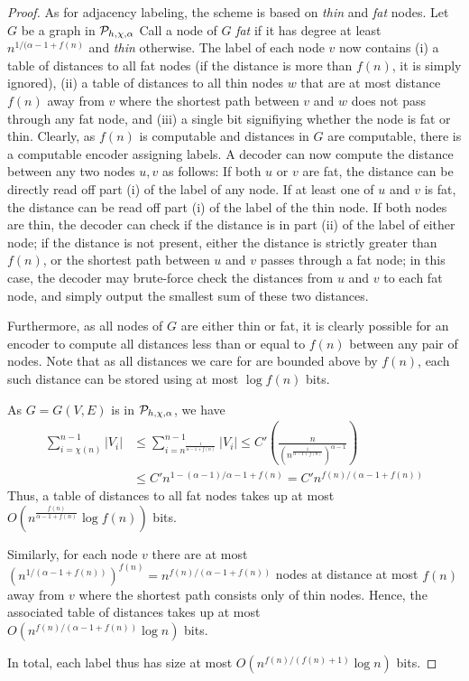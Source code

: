 \begin{proof}
As for adjacency labeling, the scheme is based on \emph{thin} and \emph{fat} nodes. Let $G$ be a graph
in $ \mathcal{P}_{h,\chi,\alpha}$ Call
a node of $G$ \emph{fat} if it has degree at least $n^{1/(\alpha - 1 + f(n)}$ and \emph{thin} otherwise.
The label of each node $v$ now contains (i) a table of distances to all fat nodes (if the distance is more than $f(n)$, it is simply ignored), (ii) a table of distances to all thin nodes $w$ that are at most distance $f(n)$ away from $v$
where the shortest path between $v$ and $w$ does not pass through any fat node, and (iii) a single bit signifiying whether the node is fat or thin.
Clearly, as $f(n)$ is computable and distances in $G$ are computable, there is a computable encoder
assigning labels. A decoder can now compute the distance between any two nodes $u,v$ as follows:
If both $u$ or $v$ are fat, the distance can be directly read off part (i) of the label of any node. If at least one of $u$ 
and $v$ is fat, the distance can be read off part (i) of the label of the thin node. If both nodes are thin, the decoder
can check if the distance is in part (ii) of the label of either node; if the distance is not present, 
either the distance is strictly greater than $f(n)$, or the shortest path between $u$ and $v$ passes through
a fat node; in this case, the decoder may brute-force check the distances from $u$ and $v$ to each fat node,
and simply output the smallest sum of these two distances.

Furthermore, as all nodes of $G$ are either thin or fat, it is clearly possible for an encoder to compute
all distances less than or equal to $f(n)$ between any pair of nodes. Note that as all distances we care for 
are bounded above by $f(n)$, each such distance can be stored using at most $\log f(n)$ bits.

As $G = G(V,E)$ is in $ \mathcal{P}_{h,\chi,\alpha}$, we have 
\begin{align*}
\sum_{i = \chi(n)}^{n-1} \vert V_i \vert
&\leq \sum_{i = n^{\frac{1}{\alpha - 1 + f(n)}}}^{n-1} \vert V_i \vert \leq C' \left( \frac{n}{\left( n^{\frac{1}{\alpha - 1 + f(n)}}\right)^{\alpha - 1}}\right)\\
&\leq C' n^{1 - (\alpha - 1)/{\alpha-1 + f(n)}} 
= C' n^{f(n)/(\alpha - 1 + f(n))}
\end{align*}
 Thus, a table of distances to all fat nodes takes up at most $O\left(n^{\frac{f(n)}{\alpha - 1 + f(n)}} \log f(n)\right)$ bits.

Similarly, for each node $v$ there are at most $\left(n^{1/(\alpha - 1 + f(n))}\right)^{f(n)} = n^{f(n)/(\alpha - 1 + f(n))}$ nodes at distance at most $f(n)$ away from $v$ where the shortest path consists only of thin nodes. Hence, the associated table of distances
takes up at most \\$O(n^{f(n)/(\alpha -1 + f(n))} \log n)$ bits.

In total, each label thus has size at most $O(n^{f(n)/(f(n)+1)} \log n)$ bits.
\end{proof}


